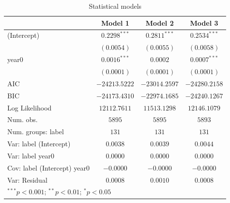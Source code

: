 
\begin{table}
\begin{center}
\begin{tabular}{l c c c}
\hline
 & Model 1 & Model 2 & Model 3 \\
\hline
(Intercept)                  & $0.2298^{***}$ & $0.2811^{***}$ & $0.2534^{***}$ \\
                             & $(0.0054)$     & $(0.0055)$     & $(0.0058)$     \\
year0                        & $0.0016^{***}$ & $0.0002$       & $0.0007^{***}$ \\
                             & $(0.0001)$     & $(0.0001)$     & $(0.0001)$     \\
\hline
AIC                          & $-24213.5222$  & $-23014.2597$  & $-24280.2158$  \\
BIC                          & $-24173.4310$  & $-22974.1685$  & $-24240.1267$  \\
Log Likelihood               & $12112.7611$   & $11513.1298$   & $12146.1079$   \\
Num. obs.                    & $5895$         & $5895$         & $5893$         \\
Num. groups: label           & $131$          & $131$          & $131$          \\
Var: label (Intercept)       & $0.0038$       & $0.0039$       & $0.0044$       \\
Var: label year0             & $0.0000$       & $0.0000$       & $0.0000$       \\
Cov: label (Intercept) year0 & $-0.0000$      & $-0.0000$      & $-0.0000$      \\
Var: Residual                & $0.0008$       & $0.0010$       & $0.0008$       \\
\hline
\multicolumn{4}{l}{\scriptsize{$^{***}p<0.001$; $^{**}p<0.01$; $^{*}p<0.05$}}
\end{tabular}
\caption{Statistical models}
\label{table:coefficients}
\end{center}
\end{table}
